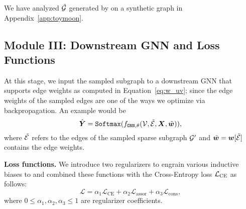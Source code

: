 We have analyzed $\tilde{{\mathcal{G}}}$ generated by \sgs on a synthetic graph in Appendix~\ref{app:toymoon}.

\begin{comment}
\begin{theorem}[Upper-bound] The expected number of edges sampled by both \sgs and idealized learning ORACLE satisfies
\begin{equation}
\mathbb{E}[|\mathcal{E}^* \cap \mathcal{\tilde{E}}|] \leq k (1 - \frac{\|p^* - \tilde{p}\|_1}{2}) 
\end{equation}
where $k = \floor{q|\mathcal{E}|/100}$ with $0 \leq q \leq 100$ as a user-specified parameter.
\end{theorem}

\textit{The implication of the upper bound.} When $\tilde{p} \rightarrow p^*$, the norm $\|p^* - \tilde{p}\|_1 \rightarrow 0$; therefore, the number of common edges could be close to $k$.

\end{comment}

\subsection{Module III: Downstream GNN and Loss Functions}
At this stage, we input the sampled subgraph to a downstream GNN that supports edge weights as computed in Equation~\ref{eq:w_uv}; since the edge weights of the sampled edges are one of the ways we optimize \edgemlp via backpropagation. An example \gnn would be 
\begin{equation}
\hat{{\bm{Y}}} = \texttt{Softmax}(f_{\texttt{GNN},\theta}({\mathcal{V}}, \tilde{{\mathcal{E}}}, {\bm{X}}, \tilde{{\bm{w}}})),
\end{equation}
where $\tilde{{\mathcal{E}}}$ refers to the edges of the sampled sparse subgraph ${\mathcal{G}}'$ and $\tilde{{\bm{w}}} = {\bm{w}}[\tilde{{\mathcal{E}}}]$ contains the edge weights. 


\noindent\textbf{Loss functions.} 
We introduce two regularizers to engrain various inductive biases to \sgs and combined these functions with the Cross-Entropy loss ${\mathcal{L}}_\mathrm{CE}$ as follows:
\begin{equation}
\mathcal{L} = \alpha_1\mathcal{L}_\mathrm{CE} + \alpha_2 \mathcal{L}_\mathrm{assor} + \alpha_3 \mathcal{L}_\mathrm{cons},
\end{equation}
where $0 \leq \alpha_1,\alpha_2,\alpha_3 \leq 1$ are regularizer coefficients.

